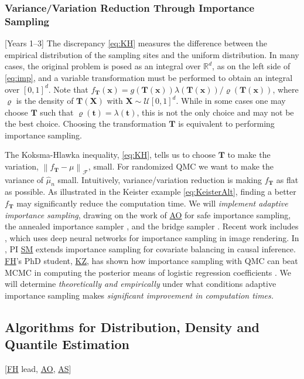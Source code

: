 \documentclass[11pt]{NSFamsart}
\newcommand{\FH}{\hyperlink{FHlink}{FH}\xspace}
\newcommand{\SM}{\hyperlink{SMlink}{SM}\xspace}
\newcommand{\AO}{\hyperlink{AOlink}{AO}\xspace}
\newcommand{\KZ}{\hyperlink{KZlink}{KZ}\xspace}
\newcommand{\AS}{\hyperlink{ASlink}{AS}\xspace}
\newcommand{\reals}{{\mathbb{R}}}
\newcommand{\bt}{{\boldsymbol{t}}}
\newcommand{\bT}{{\boldsymbol{T}}}
\newcommand{\bx}{{\boldsymbol{x}}}
\newcommand{\bX}{{\boldsymbol{X}}}
\newcommand{\calf}{{\mathcal{F}}}
\newcommand{\calu}{{\mathcal{U}}}
\newcommand{\norm}[2][{}]{\ensuremath{\left \lVert #2 \right \rVert}_{#1}}
\newcommand{\hmu}{\hat{\mu}}
\begin{document}
\subsubsection{Variance/Variation Reduction Through Importance Sampling} \label{sec:imp} %
[Years 1--3]  The discrepancy \eqref{eq:KH} measures the difference between the empirical distribution of the sampling sites and the uniform distribution.  In many cases, the original problem is posed as an integral over $\reals^d$, as on the left side of \eqref{eq:imp}, and a variable transformation must be performed to obtain an integral over $[0,1]^d$.  Note that $f_{\bT}(\bx) = g(\bT(\bx)) \lambda(\bT(\bx)) / \varrho(\bT(\bx))$, where $\varrho$ is the density of $\bT(\bX)$ with $\bX \sim \calu[0,1]^d$.  While in some cases one may choose $\bT$ such that $\varrho(\bt) = \lambda(\bt)$, this is not the only choice and may not be the best choice.  Choosing the transformation $\bT$ is equivalent to performing importance sampling.   

The Koksma-Hlawka inequality, \eqref{eq:KH}, tells us to choose $\bT$ to make the variation, $\norm[\calf]{f_{\bT} - \mu}$, small.  For randomized QMC we want to make the variance of $\hmu_n$ small.  Intuitively, variance/variation reduction is making $f_{\bT}$ as flat as possible. As illustrated in the Keister example \eqref{eq:KeisterAlt}, finding a better $f_{\bT}$ may significantly reduce the computation time.  We will \emph{implement adaptive importance sampling}, drawing on the work of  
\AO \cite{owen2000safe} for safe importance sampling, the  annealed importance sampler \cite{neal2001annealed}, and the bridge sampler \cite{gelman1998simulating}.  Recent work includes \cite{mueller2019neural}, which uses deep neural networks for importance sampling in image rendering.  In \cite{huling2020energy}, PI \SM extends importance sampling for covariate balancing in causal inference.  \FH's PhD student, \KZ, has shown how importance sampling with QMC can beat MCMC in computing the posterior means of logistic regression coefficients \cite{Zha21a}.  We will determine \emph{theoretically and empirically} under what conditions adaptive importance sampling makes \emph{significant improvement in computation times.}


\subsection{Algorithms for Distribution, Density  and Quantile  Estimation} \label{sec:distdensquant}  [\FH lead, \AO, \AS{}]
\end{document}
